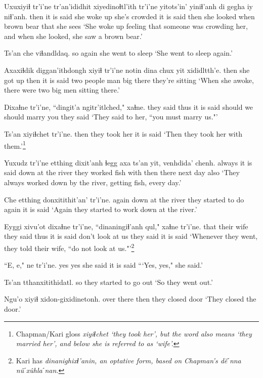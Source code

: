 \documentclass[12pt]{article}
\begin{document}
\gll Uxuxiyiɬ tr'i'ne tr'an'ididhit xiyedinoɬtl'ith tr'i'ne yitots'in' yiniɬ'anh di gegha  iy niɬ'anh.
then  {it is said} {she woke up} {she's crowded}  {it is said} then  {she looked} when {brown bear} that {she sees}
\glt `She woke up feeling that someone was crowding her, and when she looked, she saw a brown bear.'
\glend

\gll Ts'an che  viɬandldaq.
so again  {she went to sleep}
\glt `She went to sleep again.'
\glend

\gll Axaxiɬdik diggan'ithdongh xiyiɬ tr'i'ne notin dina chux yit xididltth'e.
then  {she got up} then {it is said} {two people} man big there {they're sitting}
\glt `When she awoke, there were two big men sitting there.'
\glend

\gll Dixaɬne tr'i'ne, ``dingit'a ngitr'itlched,"  xaɬne.
{they said thus} {it is said} should {we should marry you} {they said}
\glt `They said to her, ``you must marry us."'
\glend

\gll Ts'an xiyiɬchet tr'i'ne.
then {they took her} {it is said}
\glt `Then they took her with them.'\footnote{Chapman/Kari gloss \em xiyiɬchet \em `they took her', but the word also means `they married her', and below she is referred to as `wife'.}
\glend

\gll Yuxudz  tr'i'ne etthing  dixit'anh ɬegg axa ts'an yit, venhdida' chenh.
always   {it is said} {down at the river} {they worked} fish with then there {next day} also
\glt `They always worked down by the river, getting fish, every day.'
\glend

\gll Che etthing  donxitithit'an' tr'i'ne.
again {down at the river} {they started to do again} {it is said}
\glt `Again they started to work down at the river.'
\glend

\gll Eyggi xivu'ot dixaɬne tr'i'ne, {``dinaningiɬ'anh qul,"} xaɬne  tr'i'ne.
that  {their wife} {they said thus} {it is said} {don't look at us} {they said} {it is said}
\glt `Whenever they went, they told their wife, ``do not look at us."'\footnote{Kari has \em dinanighixɬ'anin, \em an optative form, based on Chapman's \em d\u{e}ˊnna n\^uˊx\^uhlaˊnan.}
\glend

\gll ``E, e," ne  tr'i'ne.
yes yes {she said} {it is said}
\glt ```Yes, yes," she said.'
\glend

\gll Ts'an  tthanxitithidatl.
so  {they started to go out}
\glt `So they went out.'
\glend

\gll Ngu'o xiyiɬ xidon-gixidinetonh.
{over there} then {they closed door}
\glt `They closed the door.'
\glend
\end{document}
